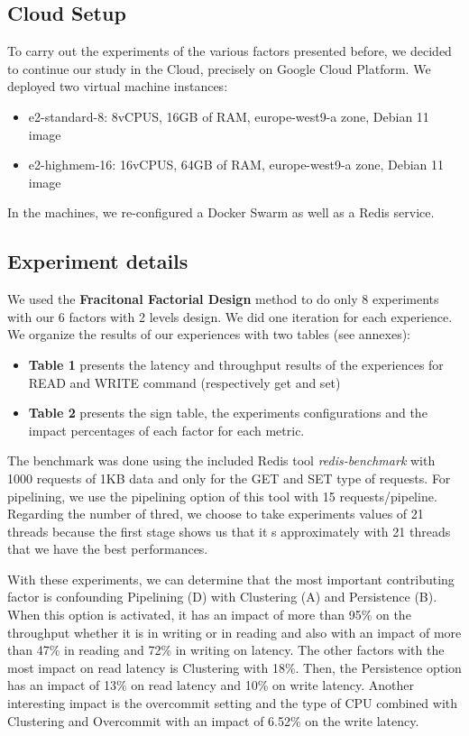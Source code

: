 \documentclass[runningheads]{llncs}
\begin{document}
\subsection{Cloud Setup}
To carry out the experiments of the various factors presented before, we decided to continue our study in the Cloud, precisely on Google Cloud Platform.
We deployed two virtual machine instances:
\begin{itemize}
    \item e2-standard-8: 8vCPUS, 16GB of RAM, europe-west9-a zone, Debian 11 image
    \item e2-highmem-16: 16vCPUS, 64GB of RAM, europe-west9-a zone, Debian 11 image
\end{itemize}

In the machines, we re-configured a Docker Swarm as well as a Redis service.

\subsection{Experiment details}

We used the \textbf{Fracitonal Factorial Design} method to do only 8 experiments with our 6 factors with 2 levels design. We did one iteration for each experience. 
We organize the results of our experiences with two tables (see annexes):
\begin{itemize}
    \item \textbf{Table 1} presents the latency and throughput results of the experiences for READ and WRITE command (respectively get and set)
    \item\textbf{Table 2} presents the sign table, the experiments configurations and the impact percentages of each factor for each metric.
\end{itemize}

The benchmark was done using the included Redis tool \textit{redis-benchmark} with 1000 requests of 1KB data and only for the GET and SET type of requests. For pipelining, we use the pipelining option of this tool with 15 requests/pipeline.
Regarding the number of thred, we choose to take experiments values of 21 threads because the first stage shows us that it s approximately with 21 threads that we have the best performances.

With these experiments, we can determine that the most important contributing factor is confounding Pipelining (D) with Clustering (A) and Persistence (B). When this option is activated, it has an impact of more than 95\% on the throughput whether it is in writing or in reading and also with an impact of more than 47\% in reading and 72\% in writing on latency.
The other factors with the most impact on read latency is Clustering with 18\%. Then, the Persistence option has an impact of 13\% on read latency and 10\% on write latency. 
Another interesting impact is the overcommit setting and the type of CPU combined with Clustering and Overcommit with an impact of 6.52\% on the write latency.
\end{document}
